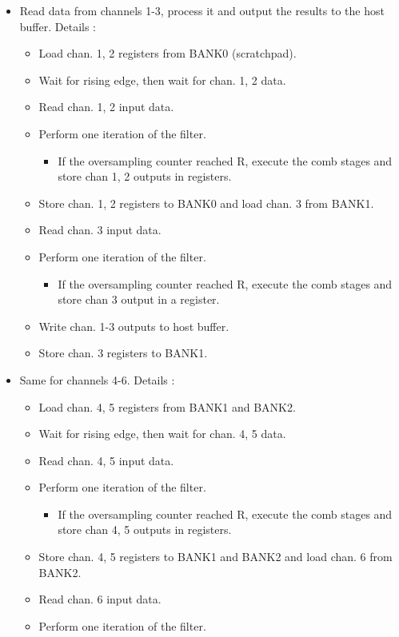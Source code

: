\documentclass[]{report}
\providecommand{\tightlist}{%
	\setlength{\itemsep}{0pt}\setlength{\parskip}{0pt}}
\begin{document}
\begin{itemize}
\tightlist
\item
  Read data from channels 1-3, process it and output the results to the
  host buffer. Details :

  \begin{itemize}
  \tightlist
  \item
    Load chan. 1, 2 registers from BANK0 (scratchpad).
  \item
    Wait for rising edge, then wait for chan. 1, 2 data.
  \item
    Read chan. 1, 2 input data.
  \item
    Perform one iteration of the filter.

    \begin{itemize}
    \tightlist
    \item
      If the oversampling counter reached R, execute the comb stages and
      store chan 1, 2 outputs in registers.
    \end{itemize}
  \item
    Store chan. 1, 2 registers to BANK0 and load chan. 3 from BANK1.
  \item
    Read chan. 3 input data.
  \item
    Perform one iteration of the filter.

    \begin{itemize}
    \tightlist
    \item
      If the oversampling counter reached R, execute the comb stages and
      store chan 3 output in a register.
    \end{itemize}
  \item
    Write chan. 1-3 outputs to host buffer.
  \item
    Store chan. 3 registers to BANK1.
  \end{itemize}
\item
  Same for channels 4-6. Details :

  \begin{itemize}
  \tightlist
  \item
    Load chan. 4, 5 registers from BANK1 and BANK2.
  \item
    Wait for rising edge, then wait for chan. 4, 5 data.
  \item
    Read chan. 4, 5 input data.
  \item
    Perform one iteration of the filter.

    \begin{itemize}
    \tightlist
    \item
      If the oversampling counter reached R, execute the comb stages and
      store chan 4, 5 outputs in registers.
    \end{itemize}
  \item
    Store chan. 4, 5 registers to BANK1 and BANK2 and load chan. 6 from
    BANK2.
  \item
    Read chan. 6 input data.
  \item
    Perform one iteration of the filter.


\end{itemize}
\end{itemize}
\end{document}

